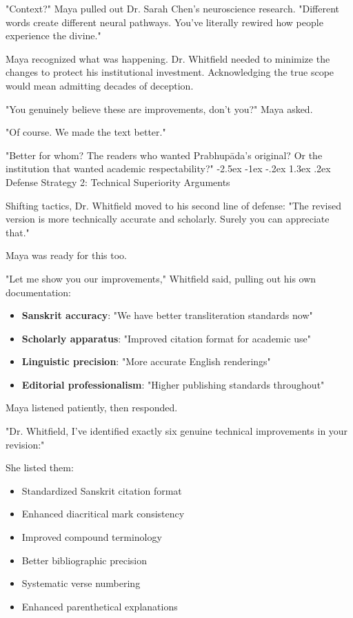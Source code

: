 \documentclass[12pt,twoside]{book}
\makeatletter
\renewcommand\section{\@startsection{section}{1}{\z@}%
{-2.5ex \@plus -1ex \@minus -.2ex}%
{1.3ex \@plus.2ex}%
{\normalfont\Large\bfseries}}
\makeatother
\begin{document}
"Context?" Maya pulled out Dr. Sarah Chen's neuroscience research. "Different words create different neural pathways. You've literally rewired how people experience the divine."

Maya recognized what was happening. Dr. Whitfield needed to minimize the changes to protect his institutional investment. Acknowledging the true scope would mean admitting decades of deception.

"You genuinely believe these are improvements, don't you?" Maya asked.

"Of course. We made the text better."

"Better for whom? The readers who wanted Prabhupāda's original? Or the institution that wanted academic respectability?"
\section{Defense Strategy 2: Technical Superiority Arguments}
\label{sec:orgf7b267e}

Shifting tactics, Dr. Whitfield moved to his second line of defense: "The revised version is more technically accurate and scholarly. Surely you can appreciate that."

Maya was ready for this too.

"Let me show you our improvements," Whitfield said, pulling out his own documentation:

\begin{itemize}
\item \textbf{\textbf{Sanskrit accuracy}}: "We have better transliteration standards now"
\item \textbf{\textbf{Scholarly apparatus}}: "Improved citation format for academic use"
\item \textbf{\textbf{Linguistic precision}}: "More accurate English renderings"
\item \textbf{\textbf{Editorial professionalism}}: "Higher publishing standards throughout"
\end{itemize}

Maya listened patiently, then responded.

"Dr. Whitfield, I've identified exactly six genuine technical improvements in your revision:"

She listed them:
\begin{itemize}
\item Standardized Sanskrit citation format
\item Enhanced diacritical mark consistency
\item Improved compound terminology
\item Better bibliographic precision
\item Systematic verse numbering
\item Enhanced parenthetical explanations
\end{itemize}
\end{document}
